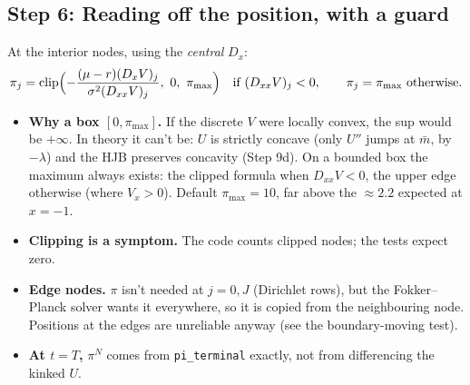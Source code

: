 \documentclass[11pt]{article}
\newcommand{\mb}{\bar m}
\begin{document}
\subsection*{Step 6: Reading off the position, with a guard}
At the interior nodes, using the \emph{central} $D_x$:
\[
  \pi_j = \operatorname{clip}\Bigl(-\frac{(\mu-r)(D_xV)_j}{\sigma^2(D_{xx}V)_j},\ 0,\ \pi_{\max}\Bigr)
  \quad\text{if }(D_{xx}V)_j<0,\qquad \pi_j=\pi_{\max}\ \text{otherwise.}
\]
\begin{itemize}
  \item \textbf{Why a box $[0,\pi_{\max}]$.} If the discrete $V$ were locally convex, the
        sup would be $+\infty$. In theory it can't be: $U$ is strictly concave (only $U''$
        jumps at $\mb$, by $-\lambda$) and the HJB preserves concavity (Step 9d). On a
        bounded box the maximum always exists: the clipped formula when $D_{xx}V<0$, the
        upper edge otherwise (where $V_x>0$). Default $\pi_{\max}=10$, far above the
        $\approx2.2$ expected at $x=-1$.
  \item \textbf{Clipping is a symptom.} The code counts clipped nodes; the tests expect zero.
  \item \textbf{Edge nodes.} $\pi$ isn't needed at $j=0,J$ (Dirichlet rows), but the
        Fokker--Planck solver wants it everywhere, so it is copied from the neighbouring node.
        Positions at the edges are unreliable anyway (see the boundary-moving test).
  \item \textbf{At $t=T$,} $\pi^N$ comes from \texttt{pi\_terminal} exactly, not from
        differencing the kinked $U$.
\end{itemize}
\end{document}
